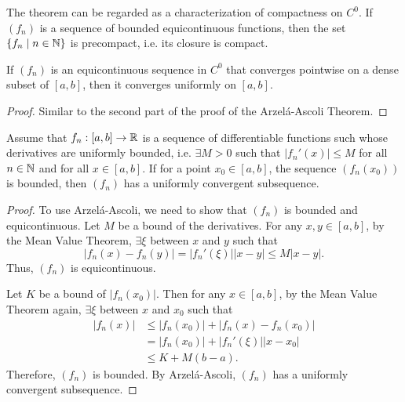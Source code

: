 \begin{rmk}
    The theorem can be regarded as a characterization of compactness on $C^0$. If $(f_n)$ is a sequence of bounded equicontinuous functions, then the set ${\left\{{f_n \mid n \in {\mathbb N}}\right\}}$ is precompact, i.e. its closure is compact.
\end{rmk}

\begin{prop}
    If $(f_n)$ is an equicontinuous sequence in $C^0$ that converges pointwise on a dense subset of $[a, b]$, then it converges uniformly on $[a, b]$.
    \begin{proof}
        Similar to the second part of the proof of the Arzel\'a-Ascoli Theorem.
    \end{proof}
\end{prop}

\begin{cl}
    Assume that $f_n: [a, b] \to {\mathbb R}$ is a sequence of differentiable functions such whose derivatives are uniformly bounded, i.e. $\exists M > 0$ such that $|f_n'(x)| \leq M$ for all $n \in {\mathbb N}$ and for all $x \in [a, b]$. If for a point $x_0 \in [a, b]$, the sequence $(f_n(x_0))$ is bounded, then $(f_n)$ has a uniformly convergent subsequence.
    \begin{proof}
        To use Arzel\'a-Ascoli, we need to show that $(f_n)$ is bounded and equicontinuous. Let $M$ be a bound of the derivatives. For any $x, y \in [a, b]$, by the Mean Value Theorem, $\exists \xi$ between $x$ and $y$ such that
        \[
        |f_n(x) - f_n(y)| = |f_n'(\xi)| |x - y| \leq M |x - y|.
        \]
        Thus, $(f_n)$ is equicontinuous. 

        Let $K$ be a bound of $|f_n(x_0)|$. Then for any $x \in [a, b]$, by the Mean Value Theorem again, $\exists \xi$ between $x$ and $x_0$ such that
        \begin{align*}
            |f_n(x)| &\leq |f_n(x_0)| + |f_n(x) - f_n(x_0)| \\
            &= |f_n(x_0)| + |f_n'(\xi)| |x - x_0| \\
            &\leq K + M(b - a).
        \end{align*}
        Therefore, $(f_n)$ is bounded. By Arzel\'a-Ascoli, $(f_n)$ has a uniformly convergent subsequence.
    \end{proof}
\end{cl}

